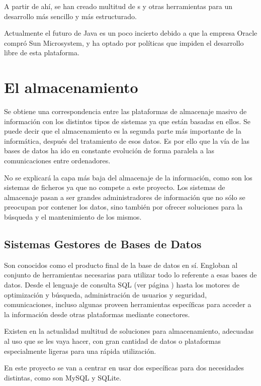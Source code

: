 A partir de ahí, se han creado multitud de \framework s y otras 
herramientas para un desarrollo más sencillo y más estructurado.

Actualmente el futuro de Java es un poco incierto debido a que la 
empresa Oracle compró Sun Microsystem, y ha optado por políticas que 
impiden el desarrollo libre de esta plataforma.

\section{El almacenamiento}
\label{sec:almacenamiento}
Se obtiene una correspondencia entre las plataformas de 
almacenaje masivo de información con los distintos tipos de sistemas 
ya que están basadas en ellos. Se puede decir que 
el almacenamiento es la segunda parte más importante de la 
informática, después del tratamiento de esos datos. Es por ello que 
la vía de las bases de datos ha ido en constante evolución de forma 
paralela a las comunicaciones entre ordenadores.

No se explicará la capa más baja del almacenaje de la información, 
como son los sistemas de ficheros ya que no compete a este proyecto. 
Los sistemas de almacenaje pasan a ser grandes administradores de 
información que no sólo se preocupan por contener los datos, sino 
también por ofrecer soluciones para la búsqueda y el mantenimiento de los 
mismos.

\subsection{Sistemas Gestores de Bases de Datos}
Son conocidos como el producto final de la base de datos  en sí. 
Engloban al conjunto de herramientas necesarias para utilizar todo lo 
referente a esas bases de datos. Desde el lenguaje de consulta SQL 
(ver página \pageref{subsec:Los70}) hasta los motores de optimización 
y búsqueda, administración de usuarios y seguridad, comunicaciones, 
incluso algunas proveen herramientas específicas para acceder a la 
información desde otras plataformas mediante conectores.

Existen en la actualidad multitud de soluciones para almacenamiento, 
adecuadas al uso que se les vaya hacer, con gran cantidad de datos o 
plataformas especialmente ligeras para una rápida utilización.

En este proyecto se van a centrar en usar dos específicas para dos 
necesidades distintas, como son MySQL y SQLite.

